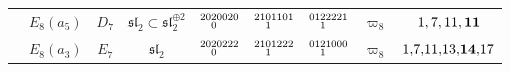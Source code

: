 \documentclass{amsart}
\theoremstyle{definition}
\newcommand{\0}{\mathcal{O}}
\begin{document}
\begin{table}[htp]
\begin{center}
\begin{tabular}{|c | c| c| c| c| c| c|c | c|}
                & $E_8(a_5)$ & $D_7$ & $\mathfrak{sl}_2\subset \mathfrak{sl}_2^{\oplus 2}$ & $\scriptsize{\begin{aligned}20 &20020 \\[-1.8mm] &0\end{aligned}}$ & $\scriptsize{\begin{aligned}21 &01101 \\[-1.8mm] &1\end{aligned}}$ 
                & $\scriptsize{\begin{aligned}0 1 &22221 \\[-1.8mm] &1\end{aligned}}$ &  $\varpi_8$ 
                & $1,7, 11, {\bf 11}$ \\    
                
                & $E_8(a_3)$ & $E_7$ & $\mathfrak{sl}_2$ & $\scriptsize{\begin{aligned}20 &20222 \\[-1.8mm] &0\end{aligned}}$ & $\scriptsize{\begin{aligned}21 &01222 \\[-1.8mm] &1\end{aligned}}$ 
				& $\scriptsize{\begin{aligned}0 1 &21000 \\[-1.8mm] &1\end{aligned}}$ &  $\varpi_8$ 
                & $\tiny{1,\!7,\! 11,\! 13,\! {\bf 14},\!17}$ \\
				\hline
			\end{tabular}
		\end{center}
	\end{table}






\end{document}
